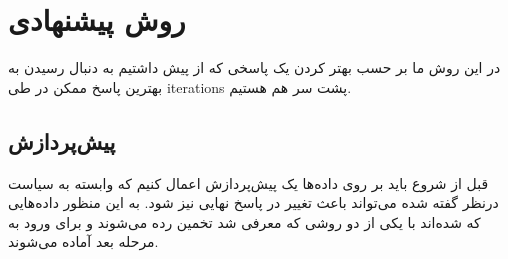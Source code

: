 	
	

\section{روش پیشنهادی}
در این روش ما بر حسب بهتر کردن یک پاسخی که از پیش داشتیم به دنبال رسیدن به بهترین پاسخ ممکن در طی \glspl{iteration} 
پشت سر هم هستیم. 

\subsection{پیش‌پردازش}
قبل از شروع باید بر روی داده‌ها یک پیش‌پردازش اعمال کنیم که وابسته به سیاست درنظر گفته شده می‌تواند باعث تغییر در پاسخ نهایی نیز شود. به این منظور داده‌هایی که  شده‌اند با یکی از دو روشی که معرفی شد تخمین رده می‌شوند و برای ورود به مرحله بعد آماده می‌شوند.


